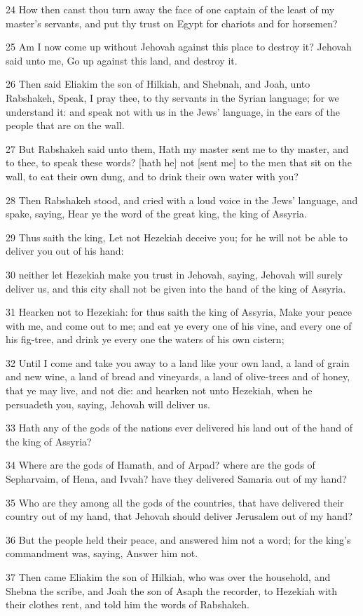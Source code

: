 \par 24 How then canst thou turn away the face of one captain of the least of my master's servants, and put thy trust on Egypt for chariots and for horsemen?
\par 25 Am I now come up without Jehovah against this place to destroy it? Jehovah said unto me, Go up against this land, and destroy it.
\par 26 Then said Eliakim the son of Hilkiah, and Shebnah, and Joah, unto Rabshakeh, Speak, I pray thee, to thy servants in the Syrian language; for we understand it: and speak not with us in the Jews' language, in the ears of the people that are on the wall.
\par 27 But Rabshakeh said unto them, Hath my master sent me to thy master, and to thee, to speak these words? [hath he] not [sent me] to the men that sit on the wall, to eat their own dung, and to drink their own water with you?
\par 28 Then Rabshakeh stood, and cried with a loud voice in the Jews' language, and spake, saying, Hear ye the word of the great king, the king of Assyria.
\par 29 Thus saith the king, Let not Hezekiah deceive you; for he will not be able to deliver you out of his hand:
\par 30 neither let Hezekiah make you trust in Jehovah, saying, Jehovah will surely deliver us, and this city shall not be given into the hand of the king of Assyria.
\par 31 Hearken not to Hezekiah: for thus saith the king of Assyria, Make your peace with me, and come out to me; and eat ye every one of his vine, and every one of his fig-tree, and drink ye every one the waters of his own cistern;
\par 32 Until I come and take you away to a land like your own land, a land of grain and new wine, a land of bread and vineyards, a land of olive-trees and of honey, that ye may live, and not die: and hearken not unto Hezekiah, when he persuadeth you, saying, Jehovah will deliver us.
\par 33 Hath any of the gods of the nations ever delivered his land out of the hand of the king of Assyria?
\par 34 Where are the gods of Hamath, and of Arpad? where are the gods of Sepharvaim, of Hena, and Ivvah? have they delivered Samaria out of my hand?
\par 35 Who are they among all the gods of the countries, that have delivered their country out of my hand, that Jehovah should deliver Jerusalem out of my hand?
\par 36 But the people held their peace, and answered him not a word; for the king's commandment was, saying, Answer him not.
\par 37 Then came Eliakim the son of Hilkiah, who was over the household, and Shebna the scribe, and Joah the son of Asaph the recorder, to Hezekiah with their clothes rent, and told him the words of Rabshakeh.

